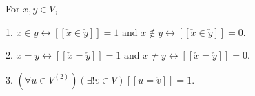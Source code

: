 For $x, y \in V$,

1. $x \in y \leftrightarrow [\![\check{x} \in \check{y}]\!] = 1$ and $x \notin y \leftrightarrow [\![\check{x} \in \check{y}]\!] = 0$.

2. $x = y \leftrightarrow [\![\check{x} = \check{y}]\!] = 1$ and $x \neq y \leftrightarrow [\![\check{x} = \check{y}]\!] = 0$.

3. $(\forall u \in V^{(2)}) (\exists! v \in V) [\![u = \check{v}]\!] = 1$.

